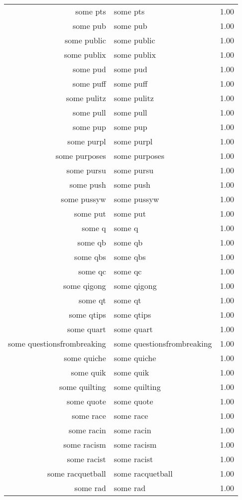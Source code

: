 \begin{table}[ht]
\begin{tabular}{rlr}
  some pts & some pts & 1.00 \\ 
  some pub & some pub & 1.00 \\ 
  some public & some public & 1.00 \\ 
  some publix & some publix & 1.00 \\ 
  some pud & some pud & 1.00 \\ 
  some puff & some puff & 1.00 \\ 
  some pulitz & some pulitz & 1.00 \\ 
  some pull & some pull & 1.00 \\ 
  some pup & some pup & 1.00 \\ 
  some purpl & some purpl & 1.00 \\ 
  some purposes & some purposes & 1.00 \\ 
  some pursu & some pursu & 1.00 \\ 
  some push & some push & 1.00 \\ 
  some pussyw & some pussyw & 1.00 \\ 
  some put & some put & 1.00 \\ 
  some q & some q & 1.00 \\ 
  some qb & some qb & 1.00 \\ 
  some qbs & some qbs & 1.00 \\ 
  some qc & some qc & 1.00 \\ 
  some qigong & some qigong & 1.00 \\ 
  some qt & some qt & 1.00 \\ 
  some qtips & some qtips & 1.00 \\ 
  some quart & some quart & 1.00 \\ 
  some questionsfrombreaking & some questionsfrombreaking & 1.00 \\ 
  some quiche & some quiche & 1.00 \\ 
  some quik & some quik & 1.00 \\ 
  some quilting & some quilting & 1.00 \\ 
  some quote & some quote & 1.00 \\ 
  some race & some race & 1.00 \\ 
  some racin & some racin & 1.00 \\ 
  some racism & some racism & 1.00 \\ 
  some racist & some racist & 1.00 \\ 
  some racquetball & some racquetball & 1.00 \\ 
  some rad & some rad & 1.00 \\ 

\end{tabular}
\end{table}
